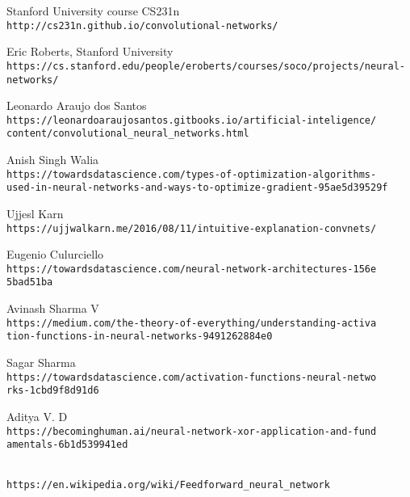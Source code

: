 \begin{thebibliography}{99}

Stanford University course CS231n
\\\texttt{http://cs231n.github.io/convolutional-networks/}

Eric Roberts, Stanford University
\\\texttt{https://cs.stanford.edu/people/eroberts/courses/soco/projects/neural-networks/}

Leonardo Araujo dos Santos
\\\texttt{https://leonardoaraujosantos.gitbooks.io/artificial-inteligence/\\content/convolutional\_neural\_networks.html}

Anish Singh Walia
\\\texttt{https://towardsdatascience.com/types-of-optimization-algorithms-\\used-in-neural-networks-and-ways-to-optimize-gradient-95ae5d39529f}

Ujjesl Karn
\\\texttt{https://ujjwalkarn.me/2016/08/11/intuitive-explanation-convnets/}

Eugenio Culurciello
\\\texttt{https://towardsdatascience.com/neural-network-architectures-156e\\5bad51ba}

Avinash Sharma V
\\\texttt{https://medium.com/the-theory-of-everything/understanding-activa\\tion-functions-in-neural-networks-9491262884e0}

Sagar Sharma
\\\texttt{https://towardsdatascience.com/activation-functions-neural-netwo\\rks-1cbd9f8d91d6}

Aditya V. D
\\\texttt{https://becominghuman.ai/neural-network-xor-application-and-fund\\amentals-6b1d539941ed}

\\\texttt{https://en.wikipedia.org/wiki/Feedforward\_neural\_network}


\end{thebibliography}
